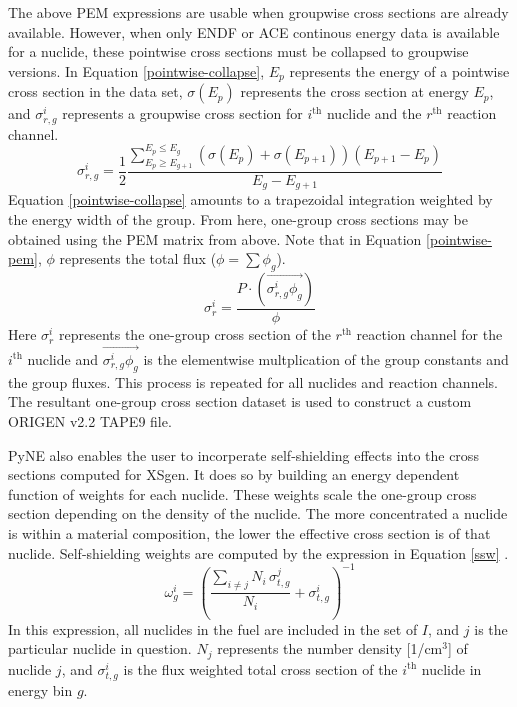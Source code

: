 \documentclass{article}
\begin{document}
The above PEM expressions are usable when groupwise cross sections are already available.
However, when only ENDF or ACE continous energy data is available for a nuclide, these pointwise
cross sections must be collapsed to groupwise versions.
In Equation \ref{pointwise-collapse}, $E_p$ represents the energy of a pointwise cross section
in the data set,
$\sigma(E_p)$ represents the cross section at energy $E_p$, and $\sigma_{r,g}^i$ represents a
groupwise cross section for $i^\mathrm{th}$ nuclide and the $r^\mathrm{th}$ reaction channel.
\begin{equation}
\label{pointwise-collapse}
\sigma_{r,g}^i = \frac{1}{2} \frac{\sum_{E_p\ge E_{g+1}}^{E_p\le E_g}
                                   \left(\sigma(E_p)+\sigma(E_{p+1})\right)
                                   \left(E_{p+1}-E_{p}\right)}
                                  {E_g-E_{g+1}}
\end{equation}
Equation \ref{pointwise-collapse} amounts to a trapezoidal integration weighted by the
energy width of the group. From here, one-group cross sections may be obtained using the PEM
matrix from above. Note that in Equation \ref{pointwise-pem}, $\phi$ represents the total
flux ($\phi=\sum\phi_g$).
\begin{equation}
\label{pointwise-pem}
\sigma_{r}^i=\frac{P \cdot (\overrightarrow{\sigma_{r,g}^i \phi_g})}{\phi}
\end{equation}
Here $\sigma_{r}^i$ represents the one-group cross section of the $r^\mathrm{th}$ reaction
channel for the $i^\mathrm{th}$ nuclide and $\overrightarrow{\sigma_{r,g}^i \phi_g}$ is the
elementwise multplication of the group constants and the group fluxes.
This process is repeated for all nuclides and reaction channels. The resultant one-group
cross section dataset is used to construct a custom ORIGEN v2.2 TAPE9 file\cite{origen2}.

PyNE also enables the user to incorperate self-shielding effects \cite{bonderanko} into the cross sections
computed for XSgen. It does so by building an energy dependent function of weights for each
nuclide. These weights scale the one-group cross section depending on the density of the
nuclide. The more concentrated a nuclide is within a material composition, the lower the
effective cross section is of that nuclide. Self-shielding weights are computed by the
expression in Equation \ref{ssw} \cite{weights}.
\begin{equation}
\label{ssw}
\omega_{g}^i=\left(\frac{\sum_{i\neq j}N_i \, \sigma_{t,g}^j}{N_i}+\sigma_{t,g}^i\right)^{-1}
\end{equation}
In this expression, all nuclides in the fuel are included in the set of $I$, and $j$ is
the particular nuclide in question. $N_j$ represents the number density [1/cm$^3$] of
nuclide $j$, and $\sigma_{t,g}^i$ is the flux weighted total cross section of
the $i^\mathrm{th}$ nuclide in energy bin $g$.
\end{document}
